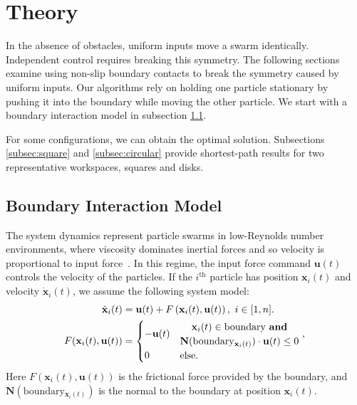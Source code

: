 \section{Theory}
\label{sec:theory}
 In the absence of obstacles, uniform inputs move a swarm identically.  
 Independent control requires breaking this symmetry. 
The following sections examine using non-slip boundary contacts to break the symmetry caused by uniform inputs.  
 Our algorithms rely on holding one particle stationary by pushing it into the boundary while moving the other particle. 
 We start with a boundary interaction model in subsection \ref{subsec:WallFriction}.
 

For some configurations, we can obtain the optimal solution. 
Subsections \ref{subsec:square} and \ref{subsec:circular} provide shortest-path results for two representative workspaces, squares and disks.
\subsection{Boundary Interaction Model}\label{subsec:WallFriction}
 The system dynamics represent particle swarms in low-Reynolds number environments, where viscosity dominates inertial forces and so velocity is proportional to input force~\cite{Purcell1977}. 
 In this regime, the input force command $\mathbf{u}(t)$ controls the velocity of the particles.  
 If the $i^{\textrm{th}}$ particle has position $\mathbf{x}_i(t)$ and velocity $\dot{\mathbf{x}}_i(t)$,  we assume the following system model:
 \begin{align}\label{eq:swarmDynamicsAndFric} 
\dot{\mathbf{x}}_i(t)
 &=
 \mathbf{u}(t)
 +F \left( \mathbf{x}_i(t), \mathbf{u}(t) \right), ~i \in [1,n].\\
 F(\mathbf{x}_i(t), \mathbf{u}(t)) &= \begin{cases}
  - \mathbf{u}(t) &\begin{matrix} \mathbf{x}_i(t) \in  \textrm{boundary \textbf{and}}\\
\mathbf{N}(\textrm{boundary$_{\mathbf{x}_i(t)}$})\cdot   \mathbf{u}(t) \le 0 \end{matrix}
\textrm{    ,} \\
 0 & \textrm{else}.
 \end{cases}\nonumber
 \end{align}
 Here  $F(\mathbf{x}_i(t), \mathbf{u}(t)) $ is the frictional force provided by the boundary, and
 $\mathbf{N}(\textrm{boundary$_{\mathbf{x}_i(t)}$})$ is the normal to the boundary at position $\mathbf{x}_i(t)$.
 
